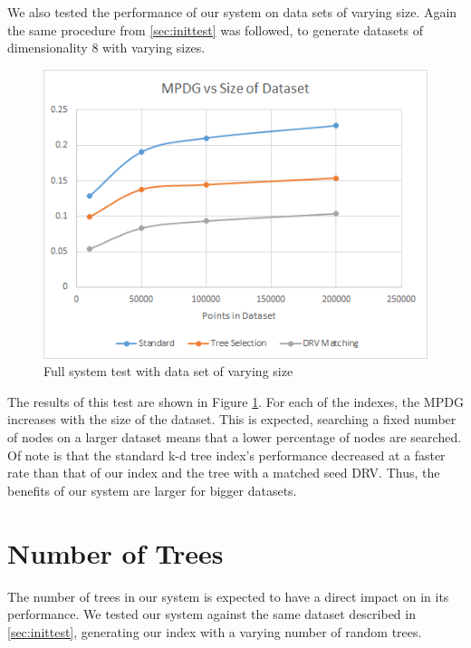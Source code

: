 We also tested the performance of our system on data sets of varying size.  Again the same procedure from \ref{sec:inittest} was followed, to generate datasets of dimensionality 8 with varying sizes.

\begin{figure}[h]
\begin{center}
\includegraphics[width=.85\textwidth]{Figures/size}
\end{center}
\caption{Full system test with data set of varying size}
\label{fig:size}
\end{figure}

The results of this test are shown in Figure \ref{fig:size}.  For each of the indexes, the MPDG increases with the size of the dataset.  This is expected, searching a fixed number of nodes on a larger dataset means that a lower percentage of nodes are searched.  Of note is that the standard k-d tree index's performance decreased at a faster rate than that of our index and the tree with a matched seed DRV.  Thus, the benefits of our system are larger for bigger datasets. 

\section{Number of Trees}

The number of trees in our system is expected to have a direct impact on in its performance.  We tested our system against the same dataset described in \ref{sec:inittest}, generating our index with a varying number of random trees.

